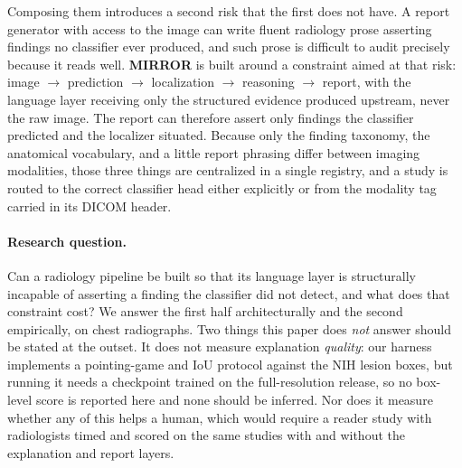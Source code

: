 \documentclass[10pt,twocolumn]{article}
\begin{document}
Composing them introduces a second risk that the first does not have. A report
generator with access to the image can write fluent radiology prose asserting
findings no classifier ever produced, and such prose is difficult to audit
precisely because it reads well. \textbf{MIRROR} is built around a constraint
aimed at that risk: image $\rightarrow$ prediction $\rightarrow$ localization
$\rightarrow$ reasoning $\rightarrow$ report, with the language layer receiving
only the structured evidence produced upstream, never the raw image. The report
can therefore assert only findings the classifier predicted and the localizer
situated. Because only the finding taxonomy, the anatomical vocabulary, and a
little report phrasing differ between imaging modalities, those three things are
centralized in a single registry, and a study is routed to the correct classifier
head either explicitly or from the modality tag carried in its DICOM header.

\paragraph{Research question.} Can a radiology pipeline be built so that its
language layer is structurally incapable of asserting a finding the classifier did
not detect, and what does that constraint cost? We answer the first half
architecturally and the second empirically, on chest radiographs. Two things this
paper does \emph{not} answer should be stated at the outset. It does not measure
explanation \emph{quality}: our harness implements a pointing-game and IoU
protocol against the NIH lesion boxes, but running it needs a checkpoint trained
on the full-resolution release, so no box-level score is reported here and none
should be inferred. Nor does it measure whether any of this helps a human, which
would require a reader study with radiologists timed and scored on the same
studies with and without the explanation and report layers.
\end{document}
